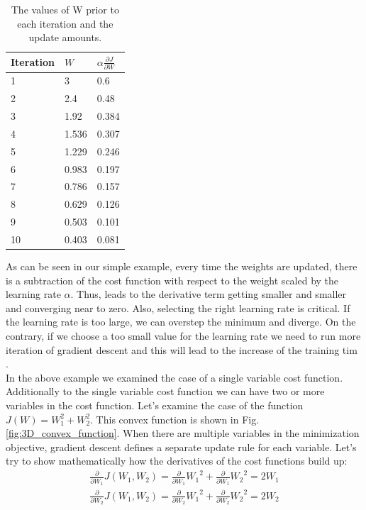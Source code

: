 \begin{table}[h!]
\centering
{
\renewcommand{\arraystretch}{1.3}
\begin{tabular}{ |p{2.5cm}|p{2.5cm}|p{2.5cm}|  }
\hline
Iteration & $W$ & $\alpha \frac{\partial J}{\partial W}$ \\
\hline
1 & 3     & 0.6 \\
2 & 2.4   & 0.48 \\
3 & 1.92  & 0.384 \\
4 & 1.536 & 0.307 \\
5 & 1.229 & 0.246 \\
6 & 0.983 & 0.197 \\
7 & 0.786 & 0.157 \\
8 & 0.629 & 0.126 \\
9 & 0.503 & 0.101 \\
10 & 0.403 & 0.081 \\
\hline
\end{tabular}
}
\caption{The values of W prior to each iteration and the update amounts.}
\label{table:gradient_descent_case}
\end{table}
As can be seen in our simple example, every time the weights are updated, there is a subtraction of the cost function with respect to the weight scaled by the learning rate $\alpha$. Thus, leads to the derivative term getting smaller and smaller and converging near to zero. Also, selecting the right learning rate is critical. If the learning rate is too large, we can overstep the minimum and diverge. On the contrary, if we choose a too small value for the learning rate we need to run more iteration of gradient descent and this will lead to the increase of the training tim \cite{mccormickml}.\\
In the above example we examined the case of a single variable cost function. Additionally to the single variable cost function we can have two or more variables in the cost function. Let's examine the case of the function $J(W) = W_1^2 + W_2^2$. This convex function is shown in Fig. \ref{fig:3D_convex_function}. When there are multiple variables in the minimization objective, gradient descent defines a separate update rule for each variable. Let's try to show mathematically how the derivatives of the cost functions build up:
\begin{align*}
\frac{\partial}{\partial W_1}J(W_1,W_2) = \frac{\partial}{\partial W_1}{W_1}^2 + \frac{\partial}{\partial W_1} {W_2}^2 = 2W_1 \\
\frac{\partial}{\partial W_2}J(W_1,W_2) = \frac{\partial}{\partial W_2}{W_1}^2 + \frac{\partial}{\partial W_2} {W_2}^2 = 2W_2
\end{align*}
